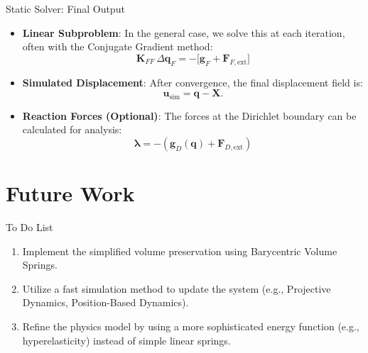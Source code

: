 \documentclass{beamer}
\begin{document}
\begin{frame}[fragile]{Static Solver: Final Output}
    \begin{itemize}
        \item \textbf{Linear Subproblem}: In the general case, we solve this at each iteration, often with the Conjugate Gradient method:
        \[
            \mathbf{K}_{FF}\,\Delta\mathbf{q}_F = -\bigl[\mathbf{g}_F + \mathbf{F}_{F,\text{ext}}\bigr]
        \]
    
        \item \textbf{Simulated Displacement}: After convergence, the final displacement field is:
        \[
           \mathbf{u}_{\text{sim}} = \mathbf{q} - \mathbf{X}.
        \]
    
        \item \textbf{Reaction Forces (Optional)}: The forces at the Dirichlet boundary can be calculated for analysis:
        \[
           \boldsymbol{\lambda} = -(\mathbf{g}_D(\mathbf{q}) + \mathbf{F}_{D,\text{ext}})
        \]
    \end{itemize}
\end{frame}

\section{Future Work}

\begin{frame}{To Do List}
    \begin{enumerate}
        \item Implement the simplified volume preservation using Barycentric Volume Springs.
        \item Utilize a fast simulation method to update the system (e.g., Projective Dynamics, Position-Based Dynamics).
        \item Refine the physics model by using a more sophisticated energy function (e.g., hyperelasticity) instead of simple linear springs.
    \end{enumerate}
\end{frame}
\end{document}
